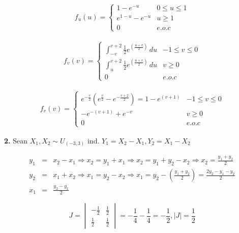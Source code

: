 \begin{eqnarray*} 
f_{u} \left(u \right) = \begin{cases}
1-e^{-u} & 0 \leq u \leq 1 \\
e^{1-u}-e^{-u} & u\geq1  \\
0 & e.o.c
\end{cases}
\end{eqnarray*}

\begin{eqnarray*} 
f_{v} \left( v \right) = \begin{cases}
\int_{-v}^{v+2} \frac{1}{2}e^{\left(\frac{u+v}{2}\right)}\,du & -1\leq v \leq 0\\
\int_{u}^{v+2} \frac{1}{2}e^{\left(\frac{u+v}{2}\right)}\,du & v \geq 0\\
0 & e.o.c
\end{cases} 
\end{eqnarray*}

\begin{eqnarray*} 
f_{v} \left( v \right) = \begin{cases}
e^{-\frac{v}{2}}\left(e^{\frac{v}{2}}-e^{- \frac{v+2}{2} } \right)= 1-e^{\left(v+1 \right) }  & -1\leq v \leq 0\\
-e^{-\left(v+1 \right)}+e^{-v} & v \geq 0\\
0 & e.o.c
\end{cases} 
\end{eqnarray*}

\smallskip

\noindent \textbf{2.} Sean $X_{1}, X_{2} \sim U_{ \left(-3,3 \right) }$ ind. $Y_{1}=X_{2}-X_{1}, Y_{2}= X_{1}-X_{2}$

\begin{eqnarray*}
y_{1}&=&x_{2}-x_{1} \Rightarrow x_{2}=y_{1}+x_{1} \Rightarrow x_{2} = y_{1}+y_{2}-x_{2} \Rightarrow x_{2}=\frac{y_{1}+y_{2}}{2}\\
y_{2}&=& x_{1}+x_{2} \Rightarrow x_{1}= y_{2}-x_{2} \Rightarrow x_{1}=y_{2}-\left( \frac{y_{1}+y_{2}}{2} \right) = \frac{2y_{2}-y_{1}-y_{2}}{2}\\
x_{1}&=& \frac{y_{2}-y_{1}}{2}
\end{eqnarray*}

\[
J=
\begin{vmatrix}
-\frac{1}{2} & \frac{1}{2}\\
\frac{1}{2} & \frac{1}{2}
\end{vmatrix} = -\frac{1}{4}-\frac{1}{4}= -\frac{1}{2}, |J|=\frac{1}{2}
\]

